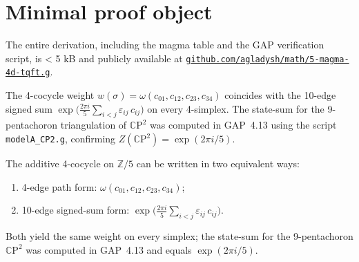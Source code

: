 \documentclass[11pt]{article}
\begin{document}
\section{Minimal proof object}
The entire derivation, including the magma table and the GAP verification script, is < 5 kB and publicly available at
\href{https://github.com/agladysh/math/5-magma-4d-tqft.g}{\texttt{github.com/agladysh/math/5-magma-4d-tqft.g}}.

\begin{remark}
The 4-cocycle weight
$w(\sigma)=\omega(c_{01},c_{12},c_{23},c_{34})$
coincides with the 10-edge signed sum
$\exp\!\bigl(\frac{2\pi i}{5}\sum_{i<j}\varepsilon_{ij}\,c_{ij}\bigr)$
on every 4-simplex.
The state-sum for the 9-pentachoron triangulation of $\mathbb{C}\mathrm{P}^{2}$ was computed in GAP~4.13 using the script \texttt{modelA\_CP2.g}, confirming $Z(\mathbb{C}\mathrm{P}^{2})=\exp(2\pi i/5)$.
\end{remark}

\begin{remark}
The additive 4-cocycle on $\mathbb{Z}/5$ can be written in two equivalent ways:
\begin{enumerate}
\item 4-edge path form: $\omega(c_{01},c_{12},c_{23},c_{34})$;
\item 10-edge signed-sum form: $\exp\!\bigl(\frac{2\pi i}{5}\sum_{i<j}\varepsilon_{ij}\,c_{ij}\bigr)$.
\end{enumerate}
Both yield the same weight on every simplex; the state-sum for the 9-pentachoron $\mathbb{C}\mathrm{P}^{2}$ was computed in GAP~4.13 and equals $\exp(2\pi i/5)$.
\end{remark}
\end{document}
